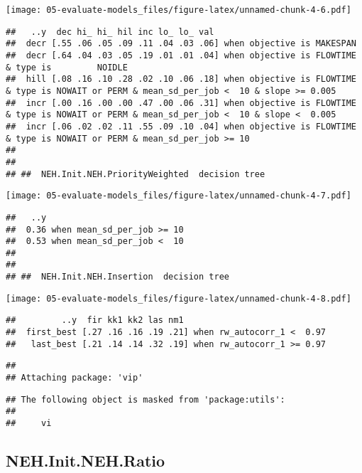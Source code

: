 \documentclass[
]{article}
\begin{document}
\texttt{[image: 05-evaluate-models\_files/figure-latex/unnamed-chunk-4-6.pdf]}

\begin{verbatim}
##   ..y  dec hi_ hi_ hil inc lo_ lo_ val                                                                                              
##  decr [.55 .06 .05 .09 .11 .04 .03 .06] when objective is MAKESPAN                                                                  
##  decr [.64 .04 .03 .05 .19 .01 .01 .04] when objective is FLOWTIME & type is         NOIDLE                                         
##  hill [.08 .16 .10 .28 .02 .10 .06 .18] when objective is FLOWTIME & type is NOWAIT or PERM & mean_sd_per_job <  10 & slope >= 0.005
##  incr [.00 .16 .00 .00 .47 .00 .06 .31] when objective is FLOWTIME & type is NOWAIT or PERM & mean_sd_per_job <  10 & slope <  0.005
##  incr [.06 .02 .02 .11 .55 .09 .10 .04] when objective is FLOWTIME & type is NOWAIT or PERM & mean_sd_per_job >= 10                 
## 
## 
## ##  NEH.Init.NEH.PriorityWeighted  decision tree
\end{verbatim}

\texttt{[image: 05-evaluate-models\_files/figure-latex/unnamed-chunk-4-7.pdf]}

\begin{verbatim}
##   ..y                           
##  0.36 when mean_sd_per_job >= 10
##  0.53 when mean_sd_per_job <  10
## 
## 
## ##  NEH.Init.NEH.Insertion  decision tree
\end{verbatim}

\texttt{[image: 05-evaluate-models\_files/figure-latex/unnamed-chunk-4-8.pdf]}

\begin{verbatim}
##         ..y  fir kk1 kk2 las nm1                            
##  first_best [.27 .16 .16 .19 .21] when rw_autocorr_1 <  0.97
##   last_best [.21 .14 .14 .32 .19] when rw_autocorr_1 >= 0.97
\end{verbatim}

\begin{verbatim}
## 
## Attaching package: 'vip'
\end{verbatim}

\begin{verbatim}
## The following object is masked from 'package:utils':
## 
##     vi
\end{verbatim}

\hypertarget{neh.init.neh.ratio}{%
\subsection{NEH.Init.NEH.Ratio}\label{neh.init.neh.ratio}}
\end{document}

